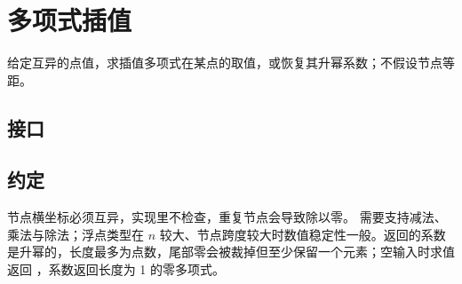 \section{多项式插值}\label{sec:interpolation}

给定互异的点值，求插值多项式在某点的取值，或恢复其升幂系数；不假设节点等距。

\subsection{接口}


\subsection{约定}

节点横坐标必须互异，实现里不检查，重复节点会导致除以零。 需要支持减法、乘法与除法；浮点类型在 $n$ 较大、节点跨度较大时数值稳定性一般。返回的系数是升幂的，长度最多为点数，尾部零会被裁掉但至少保留一个元素；空输入时求值返回 ，系数返回长度为 1 的零多项式。

